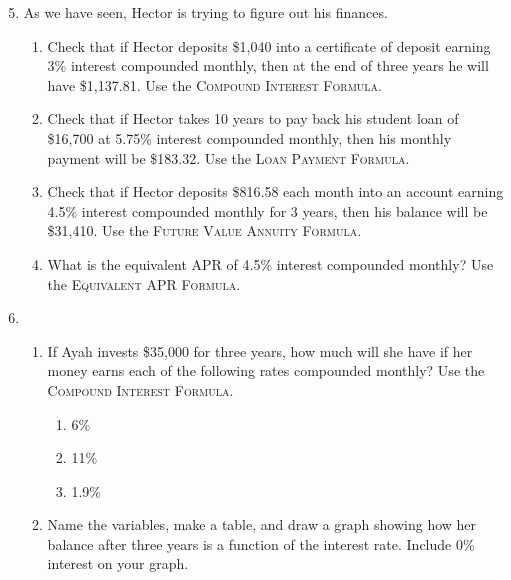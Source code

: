 \begin{enumerate} 
\setcounter{enumi}{4}

\item As we have seen, Hector is trying to figure out his finances.  
\begin{enumerate}
\item Check that if Hector deposits \$1,040 into a certificate of deposit earning 3\% interest compounded monthly, then at the end of three years he will have \$1,137.81.  Use the \textsc{Compound Interest Formula}.
\item Check that if Hector takes 10 years to pay back his student loan of \$16,700 at 5.75\% interest compounded monthly, then his monthly payment will be  \$183.32.  Use the \textsc{Loan Payment Formula}.
\item Check that if Hector deposits \$816.58 each month into an account earning 4.5\% interest compounded monthly for 3 years, then his balance will be \$31,410.  Use the \textsc{Future Value Annuity Formula}.
\item What is the equivalent APR of 4.5\% interest compounded monthly?  Use the \textsc{Equivalent APR Formula}.
\end{enumerate}

\item \begin{enumerate}
\item If Ayah invests \$35,000 for three years, how much will she have if her money earns each of the following rates compounded monthly? Use the \textsc{Compound Interest Formula}.
\begin{multicols}{4}
\begin{enumerate}
\item 6\%
\item 11\%
\item 1.9\%
\end{enumerate}
\end{multicols}
\item Name the variables, make a table, and draw a graph showing how her balance after three years is a function of the interest rate.  Include 0\% interest on your graph.
\end{enumerate}


\end{enumerate}
